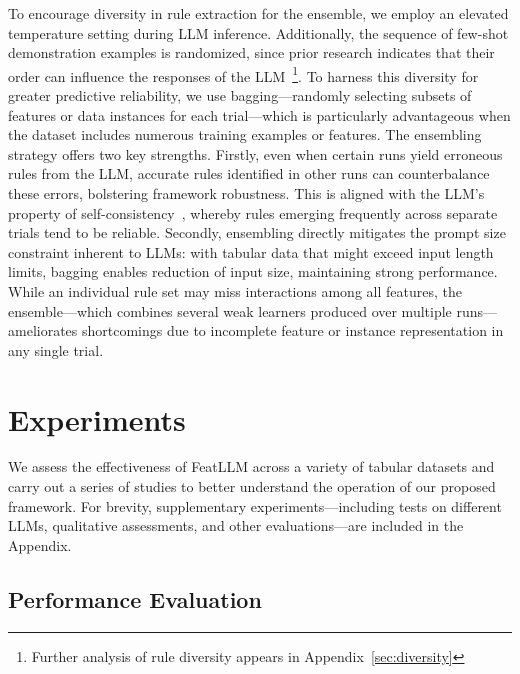 To encourage diversity in rule extraction for the ensemble, we employ an elevated temperature setting during LLM inference. Additionally, the sequence of few-shot demonstration examples is randomized, since prior research indicates that their order can influence the responses of the LLM~\cite{lu2022fantastically}\footnote{Further analysis of rule diversity appears in Appendix~\ref{sec:diversity}}. To harness this diversity for greater predictive reliability, we use bagging—randomly selecting subsets of features or data instances for each trial—which is particularly advantageous when the dataset includes numerous training examples or features. The ensembling strategy offers two key strengths. Firstly, even when certain runs yield erroneous rules from the LLM, accurate rules identified in other runs can counterbalance these errors, bolstering framework robustness. This is aligned with the LLM's property of self-consistency~\cite{wang2022self}, whereby rules emerging frequently across separate trials tend to be reliable. Secondly, ensembling directly mitigates the prompt size constraint inherent to LLMs: with tabular data that might exceed input length limits, bagging enables reduction of input size, maintaining strong performance. While an individual rule set may miss interactions among all features, the ensemble—which combines several weak learners produced over multiple runs—ameliorates shortcomings due to incomplete feature or instance representation in any single trial.

\section{Experiments}
We assess the effectiveness of \textsf{FeatLLM} across a variety of tabular datasets and carry out a series of studies to better understand the operation of our proposed framework. For brevity, supplementary experiments—including tests on different LLMs, qualitative assessments, and other evaluations—are included in the Appendix.

\subsection{Performance Evaluation}
